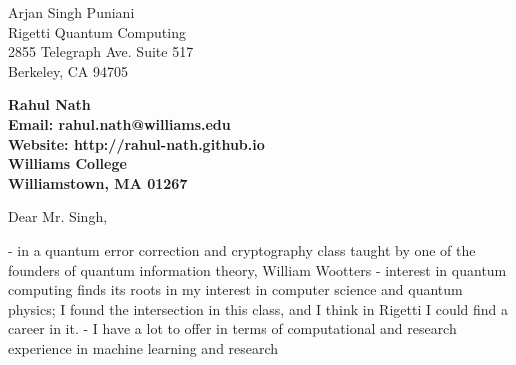 \documentclass[11pt]{letter} %
\newcommand{\forceindent}{\leavevmode{\parindent=24pt\indent}}
\begin{document}

\begin{letter}{Arjan Singh Puniani \\
Rigetti Quantum Computing \\
2855 Telegraph Ave. Suite 517\\
Berkeley, CA 94705} 


\begin{center}
\large\bf Rahul Nath \\ %
Email: rahul.nath@williams.edu \\ Website: http://rahul-nath.github.io \\ Williams College \\ Williamstown, MA 01267
\end{center}


\opening{Dear Mr. Singh,}

\forceindent 


- in a quantum error correction and cryptography class taught by one of the founders of quantum information theory, William Wootters
- interest in quantum computing finds its roots in my interest in computer science and quantum physics; I found the intersection in this class, and I think in Rigetti I could find a career in it.
- I have a lot to offer in terms of computational and research experience in machine learning and research 


\end{letter}
\end{document}
